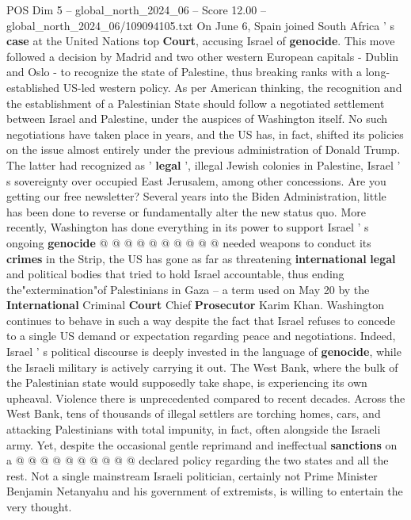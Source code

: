 \begin{textsample}{POS Dim 5 – global\_north\_2024\_06 – Score 12.00 – global\_north\_2024\_06/109094105.txt}  \label{ex:f5_pos_377}
On June 6, Spain joined South Africa ' s \textbf{case} at the United Nations top \textbf{Court}, accusing Israel of \textbf{genocide}.
This move followed a decision by Madrid and two other western European capitals - Dublin and Oslo - to recognize the state of Palestine, thus breaking ranks with a long-established US-led western policy.
As per American thinking, the recognition and the establishment of a Palestinian State should follow a negotiated settlement between Israel and Palestine, under the auspices of Washington itself.
No such negotiations have taken place in years, and the US has, in fact, shifted its policies on the issue almost entirely under the previous administration of Donald Trump.
The latter had recognized as ' \textbf{legal} ', illegal Jewish colonies in Palestine, Israel ' s sovereignty over occupied East Jerusalem, among other concessions.
Are you getting our free newsletter?
Several years into the Biden Administration, little has been done to reverse or fundamentally alter the new status quo.
More recently, Washington has done everything in its power to support Israel ' s ongoing \textbf{genocide} @ @ @ @ @ @ @ @ @ @ needed weapons to conduct its \textbf{crimes} in the Strip, the US has gone as far as threatening \textbf{international} \textbf{legal} and political bodies that tried to hold Israel accountable, thus ending the"extermination"of Palestinians in Gaza -- a term used on May 20 by the \textbf{International} Criminal \textbf{Court} Chief \textbf{Prosecutor} Karim Khan.
Washington continues to behave in such a way despite the fact that Israel refuses to concede to a single US demand or expectation regarding peace and negotiations.
Indeed, Israel ' s political discourse is deeply invested in the language of \textbf{genocide}, while the Israeli military is actively carrying it out.
The West Bank, where the bulk of the Palestinian state would supposedly take shape, is experiencing its own upheaval.
Violence there is unprecedented compared to recent decades.
Across the West Bank, tens of thousands of illegal settlers are torching homes, cars, and attacking Palestinians with total impunity, in fact, often alongside the Israeli army.
Yet, despite the occasional gentle reprimand and ineffectual \textbf{sanctions} on a @ @ @ @ @ @ @ @ @ @ declared policy regarding the two states and all the rest.
Not a single mainstream Israeli politician, certainly not Prime Minister Benjamin Netanyahu and his government of extremists, is willing to entertain the very thought.

\end{textsample}
